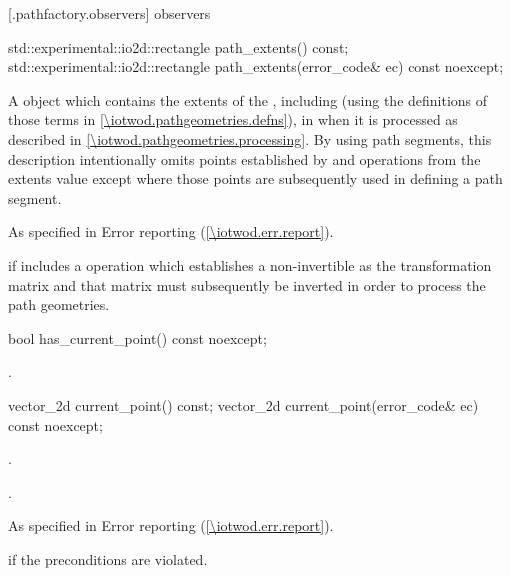  [\iotwod.pathfactory.observers] { observers}

\begin{itemdecl}
    std::experimental::io2d::rectangle path_extents() const;
    std::experimental::io2d::rectangle path_extents(error_code& ec) const noexcept;
\end{itemdecl}
\begin{itemdescr}
	\pnum
	\returns
	A  object which contains the extents of the , including  (using the definitions of those terms in \ref{\iotwod.pathgeometries.defns}), in  when it is processed as described in \ref{\iotwod.pathgeometries.processing}.
	\enternote
	By using path segments, this description intentionally omits points established by  and  operations from the extents value except where those points are subsequently used in defining a path segment.
	\exitnote

	\pnum
	\throws
	As specified in Error reporting (\ref{\iotwod.err.report}).

	\pnum
	\errors
	 if  includes a  operation which establishes a non-invertible  as the transformation matrix and that matrix must subsequently be inverted in order to process the path geometries.
\end{itemdescr}

\begin{itemdecl}
    bool has_current_point() const noexcept;
\end{itemdecl}
\begin{itemdescr}
	\pnum
	\returns
	.

\end{itemdescr}

\begin{itemdecl}
    vector_2d current_point() const;
    vector_2d current_point(error_code& ec) const noexcept;
\end{itemdecl}
\begin{itemdescr}
	\pnum
	\preconditions
	.
	
	\pnum
	\returns
	.

	\pnum
	\throws
	As specified in Error reporting (\ref{\iotwod.err.report}).

	\pnum
	\errors
	 if the preconditions are violated.
	
\end{itemdescr}

